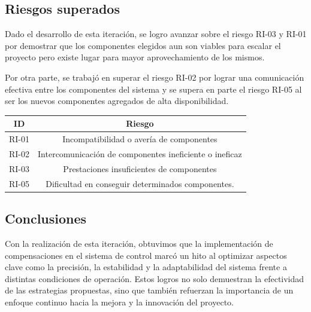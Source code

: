 \subsection{Riesgos superados}

Dado el desarrollo de esta iteración, se logro avanzar sobre el riesgo RI-03 y RI-01 por demostrar que los componentes elegidos aun son viables para escalar el proyecto pero existe lugar para mayor aprovechamiento de los mismos.

Por otra parte, se trabajó en superar el riesgo RI-02 por lograr una comunicación efectiva entre los componentes del sistema y se supera en parte el riesgo RI-05 al ser los nuevos componentes agregados de alta disponibilidad.

\begin{center} \begin{tabular}{|c|c|}
    \hline
        ID & Riesgo \\
    \hline
        RI-01 & Incompatibilidad o avería de componentes \\
    \hline
        RI-02 & Intercomunicación de componentes ineficiente o ineficaz \\
    \hline
        RI-03 & Prestaciones insuficientes de componentes \\
    \hline
        RI-05 & Dificultad en conseguir determinados componentes. \\
    \hline
\end{tabular} \end{center}

\subsection{Conclusiones}

Con la realización de esta iteración, obtuvimos que la implementación de compensaciones en el sistema de control marcó un hito al optimizar aspectos clave como la precisión, la estabilidad y la adaptabilidad del sistema frente a distintas condiciones de operación. Estos logros no solo demuestran la efectividad de las estrategias propuestas, sino que también refuerzan la importancia de un enfoque continuo hacia la mejora y la innovación del proyecto.
